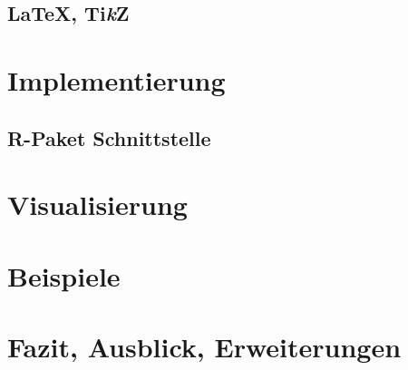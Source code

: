 \documentclass[germanthesis]{thesis-style}
\begin{document}
\section{\LaTeX, Ti\textit{k}Z}

\chapter{Implementierung}
\label{chapter:implementierung}


\section{R-Paket Schnittstelle}
\label{chapter:interface}


\chapter{Visualisierung}
\label{chapter:visualisierung}


\chapter{Beispiele}
\label{chapter:beispiele}

\chapter{Fazit, Ausblick, Erweiterungen}
\label{chapter:fazit}

\cleardoublepage%

\listofabbreviations
\clearpage

\listoffigures
\clearpage

\listoftables
\clearpage

\lstlistoflistings
\clearpage

\printbibliography
\end{document}

